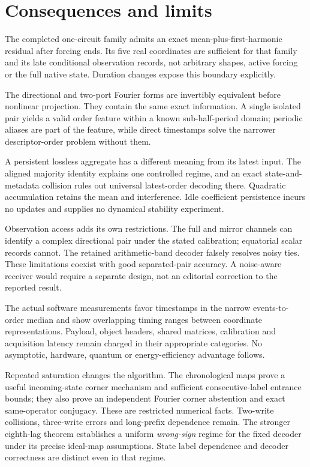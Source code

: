 \section{Consequences and limits}\label{sec:closing}
The completed one-circuit family admits an exact mean-plus-first-harmonic residual after forcing ends. Its five real coordinates are sufficient for that family and its late conditional observation records, not arbitrary shapes, active forcing or the full native state. Duration changes expose this boundary explicitly.

The directional and two-port Fourier forms are invertibly equivalent before nonlinear projection. They contain the same exact information. A single isolated pair yields a valid order feature within a known sub-half-period domain; periodic aliases are part of the feature, while direct timestamps solve the narrower descriptor-order problem without them.

A persistent lossless aggregate has a different meaning from its latest input. The aligned majority identity explains one controlled regime, and an exact state-and-metadata collision rules out universal latest-order decoding there. Quadratic accumulation retains the mean and interference. Idle coefficient persistence incurs no updates and supplies no dynamical stability experiment.

Observation access adds its own restrictions. The full and mirror channels can identify a complex directional pair under the stated calibration; equatorial scalar records cannot. The retained arithmetic-band decoder falsely resolves noisy ties. These limitations coexist with good separated-pair accuracy. A noise-aware receiver would require a separate design, not an editorial correction to the reported result.

The actual software measurements favor timestamps in the narrow events-to-order median and show overlapping timing ranges between coordinate representations. Payload, object headers, shared matrices, calibration and acquisition latency remain charged in their appropriate categories. No asymptotic, hardware, quantum or energy-efficiency advantage follows.

Repeated saturation changes the algorithm. The chronological maps prove a useful incoming-state corner mechanism and sufficient consecutive-label entrance bounds; they also prove an independent Fourier corner abstention and exact same-operator conjugacy. These are restricted numerical facts. Two-write collisions, three-write errors and long-prefix dependence remain. The stronger eighth-lag theorem establishes a uniform \emph{wrong-sign} regime for the fixed decoder under its precise ideal-map assumptions. State label dependence and decoder correctness are distinct even in that regime.


